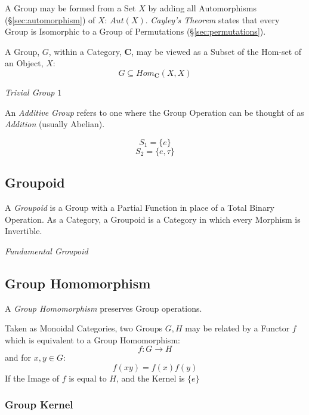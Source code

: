 A Group may be formed from a Set $X$ by adding all Automorphisms
(\S\ref{sec:automorphism}) of $X$: $Aut(X)$. \emph{Cayley's
  Theorem} states that every Group is Isomorphic to a Group of
Permutations (\S\ref{sec:permutations}).

A Group, $G$, within a Category, $\mathbf{C}$, may be viewed as a
Subset of the Hom-set of an Object, $X$:
\[
    G \subseteq Hom_{\mathbf{C}}(X,X)
\]

\emph{Trivial Group} ${1}$

An \emph{Additive Group} refers to one where the Group Operation can
be thought of as \emph{Addition} (usually Abelian).

\[
    S_1 = \{e\}
\] \[
    S_2 = \{e, \tau\}
\]



\subsection{Groupoid}\label{sec:groupoid}

A \emph{Groupoid} is a Group with a Partial Function in place of a
Total Binary Operation. As a Category, a Groupoid is a Category in
which every Morphism is Invertible.

\emph{Fundamental Groupoid}



\subsection{Group Homomorphism}\label{sec:group_homomorphism}

A \emph{Group Homomorphism} preserves Group operations.

Taken as Monoidal Categories, two Groups $G, H$ may be related by a
Functor $f$ which is equivalent to a Group Homomorphism:
\[
    f : G \rightarrow H
\]
and for $x,y \in G$:
\[
    f(xy) = f(x)f(y)
\]
If the Image of $f$ is equal to $H$, and the Kernel is $\{e\}$ %



\subsubsection{Group Kernel}\label{sec:group_kernel}

